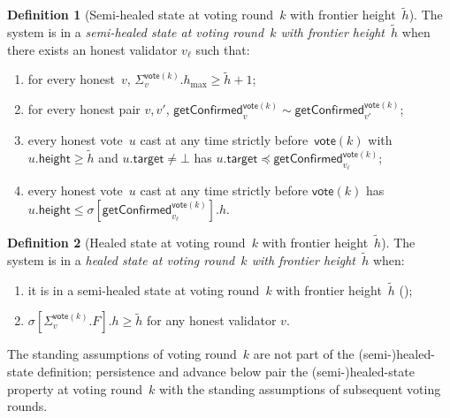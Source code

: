 \ifx\litemode\undefined\documentclass{article}\fi
\newcommand{\target}{\mathsf{target}}
\newcommand{\height}{\mathsf{height}}
\newcommand{\hmax}{\ensuremath{h_{\max}}\xspace}
\newcommand{\vote}{\ensuremath{\mathsf{vote}}}
\newcommand{\comm}[1]{\ensuremath{\widetilde{#1}}}
\newcommand{\getConfirmed}{\textsf{getConfirmed}\xspace}
\theoremstyle{plain}
\theoremstyle{definition}
\newtheorem{definition}{Definition}
\theoremstyle{remark}
\begin{document}
\begin{definition}[Semi-healed state at voting round~$k$ with frontier height~$\comm{h}$]\label{def:semi-healed}
The system is in a \emph{semi-healed state at voting round~$k$ with frontier height~$\comm{h}$} when there exists an honest validator $v_\ell$ such that:
\begin{enumerate}
  \item\label{rev:def:healed-state:h} for every honest~$v$, $\Sigma_v^{\vote(k)}.\hmax \geq \comm{h}+1$;
  \item\label{rev:def:healed-state:compat} for every honest pair $v, v'$, $\getConfirmed_v^{\vote(k)} \sim \getConfirmed_{v'}^{\vote(k)}$;
  \item\label{rev:def:healed-state:cap} every honest vote~$u$ cast at any time strictly before~$\vote(k)$ with $u.\height \geq \comm{h}$ and $u.\target \neq \bot$  has $u.\target \preceq \getConfirmed_{v_\ell}^{\vote(k)}$;
  \item\label{rev:def:healed-state:vote-h} every honest vote~$u$ cast at any time strictly before $\vote(k)$ has $u.\height \leq \sigma[\getConfirmed_{v_\ell}^{\vote(k)}].h$.
\end{enumerate}
\end{definition}

\begin{definition}[Healed state at voting round~$k$ with frontier height~$\comm{h}$]\label{def:healed}
The system is in a \emph{healed state at voting round~$k$ with frontier height~$\comm{h}$} when:
\begin{enumerate}
  \item it is in a semi-healed state at voting round~$k$ with frontier height~$\comm{h}$ ();
  \item\label{rev:def:healed-state:F-cap} $\sigma[\Sigma_v^{\vote(k)}.F].h \geq \comm{h}$ for any honest validator $v$.
\end{enumerate}
\end{definition}

The standing assumptions of voting round~$k$ are not part of the (semi-)healed-state definition; persistence and advance below pair the (semi-)healed-state property at voting round~$k$ with the standing assumptions of subsequent voting rounds.
\end{document}
